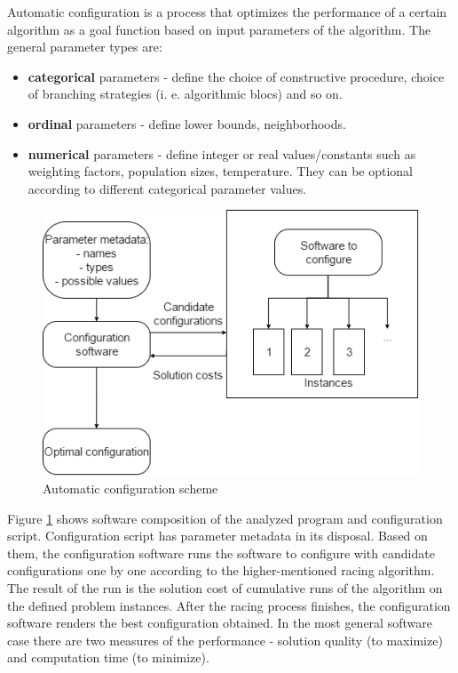 \documentclass[12pt]{article}
\begin{document}
Automatic configuration is a process that optimizes the performance of a certain algorithm as a goal function based on input parameters of the algorithm. The general parameter types are:
 
\begin{itemize}
\item \textbf{categorical} parameters - define the choice of constructive procedure, choice of branching strategies (i. e. algorithmic blocs) and so on.
\item \textbf{ordinal} parameters - define lower bounds, neighborhoods.
\item \textbf{numerical} parameters - define integer or real values/constants such as weighting factors, population sizes, temperature. They can be optional according to different categorical parameter values.
\end{itemize}

\begin{figure}[H]
  \centering
    \includegraphics[scale=0.7]{configuration-top-level.png}
  \caption{Automatic configuration scheme}
  \label{fig:autoconf}
\end{figure}

Figure \ref{fig:autoconf} shows software composition of the analyzed program and configuration script. Configuration script has parameter metadata in its disposal. Based on them, the configuration software runs the software to configure with candidate configurations one by one according to the higher-mentioned racing algorithm. The result of the run is the solution cost of cumulative runs of the algorithm on the defined problem instances. After the racing process finishes, the configuration software renders the best configuration obtained. In the most general software case there are two measures of the performance - solution quality (to maximize) and computation time (to minimize).
\end{document}
